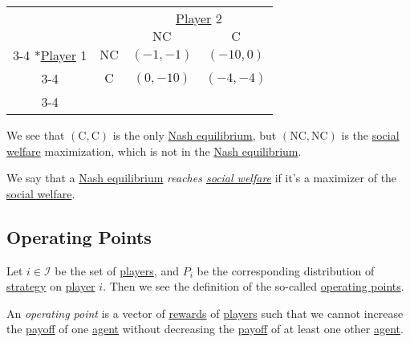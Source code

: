 \begin{prev}
\begin{itemize}
\begin{table}[H]
\begin{tabular}{cc|c|c|}
				                                                     & \multicolumn{1}{c}{} & \multicolumn{2}{c}{\hyperref[def:player]{Player} 2}                                    \\
				                                                     & \multicolumn{1}{c}{} & \multicolumn{1}{c}{$\mathrm{NC}$}                   & \multicolumn{1}{c}{$\mathrm{C}$} \\\cline{3-4}
				      \multirow{2}*{\hyperref[def:player]{Player} 1} & $\mathrm{NC}$        & $(-1, -1)$                                          & $(-10, 0)$                       \\\cline{3-4}
				                                                     & $\mathrm{C}$         & $(0, -10)$                                          & $(-4, -4)$                       \\\cline{3-4}
			      \end{tabular}
		      \end{table}
		      We see that \((\mathrm{C} , \mathrm{C} )\) is the only \hyperref[def:Nash-equilibrium]{Nash equilibrium}, but \((\mathrm{NC}, \mathrm{NC} )\) is
		      the \hyperref[def:social-welfare]{social welfare} maximization, which is not in the \hyperref[def:Nash-equilibrium]{Nash equilibrium}.
	\end{itemize}
\end{prev}

\begin{remark}
	We say that a \hyperref[def:Nash-equilibrium]{Nash equilibrium} \emph{reaches \hyperref[def:social-welfare]{social welfare}} if it's a
	maximizer of the \hyperref[def:social-welfare]{social welfare}.
\end{remark}

\subsection{Operating Points}
Let \(i\in \mathcal{I} \) be the set of \hyperref[def:player]{players}, and \(P_{i}\) be the corresponding distribution of \hyperref[def:mixed-strategy]{strategy}
on \hyperref[def:player]{player} \(i\). Then we see the definition of the so-called \hyperref[def:operating-point]{operating points}.

\begin{definition}\label{def:operating-point}
	An \emph{operating point} is a vector of \hyperref[def:reward]{rewards} of \hyperref[def:player]{players} such that we cannot increase
	the \hyperref[def:reward]{payoff} of one \hyperref[def:player]{agent} without decreasing the \hyperref[def:reward]{payoff} of at least
	one other \hyperref[def:player]{agent}.
\end{definition}


